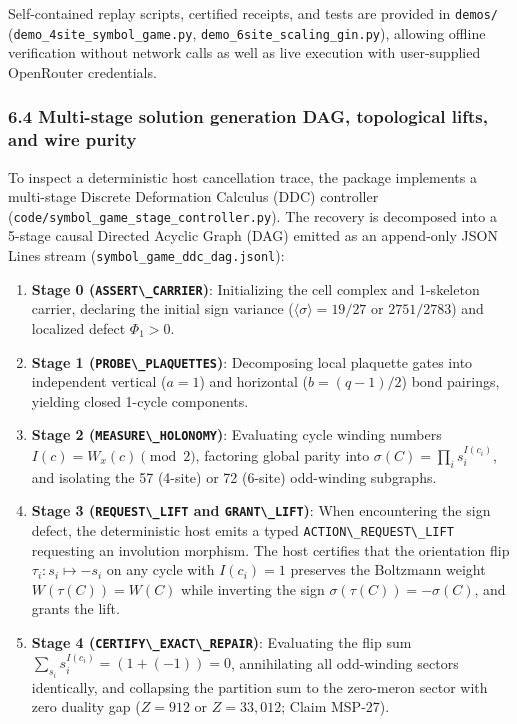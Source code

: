 \documentclass[
  11pt,
]{article}
\newcommand{\passthrough}[1]{#1}
\providecommand{\tightlist}{%
  \setlength{\itemsep}{0pt}\setlength{\parskip}{0pt}}
\begin{document}
Self-contained replay scripts, certified receipts, and tests are
provided in \passthrough{\lstinline!demos/!}
(\nolinkurl{demo_4site_symbol_game.py},
\nolinkurl{demo_6site_scaling_gin.py}), allowing offline verification
without network calls as well as live execution with user-supplied
OpenRouter credentials.

\subsubsection{6.4 Multi-stage solution generation DAG, topological
lifts, and wire
purity}\label{multi-stage-solution-generation-dag-topological-lifts-and-wire-purity}

To inspect a deterministic host cancellation trace, the package
implements a multi-stage Discrete Deformation Calculus (DDC) controller
(\nolinkurl{code/symbol_game_stage_controller.py}). The recovery is
decomposed into a 5-stage causal Directed Acyclic Graph (DAG) emitted as
an append-only JSON Lines stream
(\nolinkurl{symbol_game_ddc_dag.jsonl}):

\begin{enumerate}
\def\labelenumi{\arabic{enumi}.}
\tightlist
\item
  \textbf{Stage 0 (\passthrough{\lstinline!ASSERT\_CARRIER!})}:
  Initializing the cell complex and 1-skeleton carrier, declaring the
  initial sign variance (\(\langle\sigma\rangle = 19/27\) or
  \(2751/2783\)) and localized defect \(\Phi_1 > 0\).
\item
  \textbf{Stage 1 (\passthrough{\lstinline!PROBE\_PLAQUETTES!})}:
  Decomposing local plaquette gates into independent vertical (\(a=1\))
  and horizontal (\(b=(q-1)/2\)) bond pairings, yielding closed 1-cycle
  components.
\item
  \textbf{Stage 2 (\passthrough{\lstinline!MEASURE\_HOLONOMY!})}:
  Evaluating cycle winding numbers \(I(c) =
  W_x(c) \pmod 2\), factoring global parity into
  \(\sigma(C) = \prod_i s_i^{I(c_i)}\), and isolating the 57 (4-site) or
  72 (6-site) odd-winding subgraphs.
\item
  \textbf{Stage 3 (\passthrough{\lstinline!REQUEST\_LIFT!} and
  \passthrough{\lstinline!GRANT\_LIFT!})}: When encountering the sign
  defect, the deterministic host emits a typed
  \passthrough{\lstinline!ACTION\_REQUEST\_LIFT!} requesting an
  involution morphism. The host certifies that the orientation flip
  \(\tau_i: s_i \mapsto -s_i\) on any cycle with \(I(c_i) = 1\)
  preserves the Boltzmann weight \(W(\tau(C)) = W(C)\) while inverting
  the sign \(\sigma(\tau(C)) = -\sigma(C)\), and grants the lift.
\item
  \textbf{Stage 4 (\passthrough{\lstinline!CERTIFY\_EXACT\_REPAIR!})}:
  Evaluating the flip sum \(\sum_{s_i} s_i^{I(c_i)} = (1 + (-1)) = 0\),
  annihilating all odd-winding sectors identically, and collapsing the
  partition sum to the zero-meron sector with zero duality gap
  (\(Z = 912\) or \(Z = 33{,}012\); Claim MSP-27).
\end{enumerate}
\end{document}
